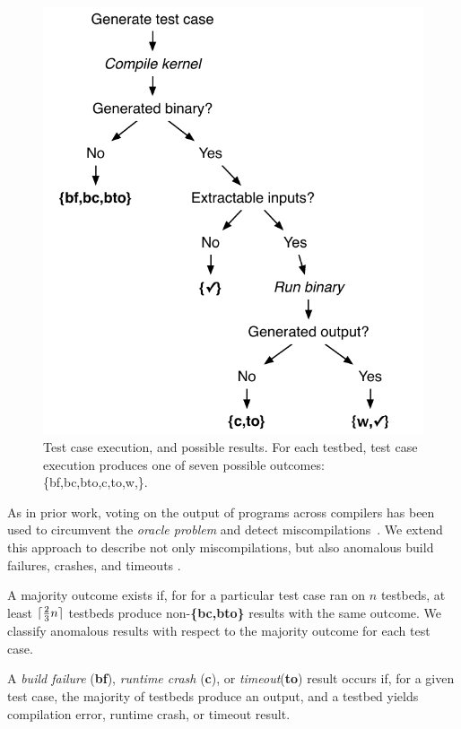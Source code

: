 \begin{figure}
  \centering %
  \includegraphics[width=.8\columnwidth]{img/test_process}%
  \caption{%
 	  Test case execution, and possible results. For each testbed, test case execution produces one of seven possible outcomes: \{bf,bc,bto,c,to,w,\cmark\}.%
  }%
  \label{fig:test-process} %
\end{figure}

As in prior work, voting on the output of programs across compilers has been used to circumvent the \emph{oracle problem} and detect miscompilations~\cite{McKeeman1998}.
We extend this approach to describe not only miscompilations, but also anomalous build failures, crashes, and timeouts .

A majority outcome exists if, for for a particular test case ran on $n$ testbeds, at least $\lceil\frac{2}{3}n\rceil$ testbeds produce non-\textbf{\{bc,bto\}} results with the same outcome. We classify anomalous results with respect to the majority outcome for each test case.

A \emph{build failure} (\textbf{bf}), \emph{runtime crash} (\textbf{c}), or \emph{timeout}(\textbf{to}) result occurs if, for a given test case, the majority of testbeds produce an output, and a testbed yields compilation error, runtime crash, or timeout result.

